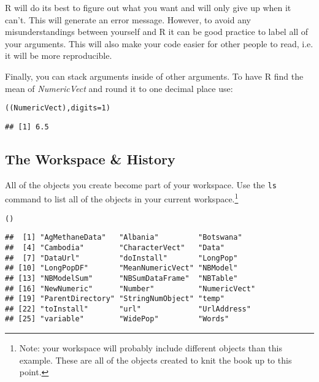 \noindent R will do its best to figure out what you want and will only give up when it can't. This will generate an error message. However, to avoid any misunderstandings between yourself and R it can be good practice to label all of your arguments. This will also make your code easier for other people to read, i.e. it will be more reproducible.

Finally, you can stack arguments inside of other arguments. To have R find the mean of {\emph{NumericVect}} and round it to one decimal place use:

\begin{knitrout}
\color{fgcolor}\begin{kframe}
\begin{alltt}
((NumericVect), digits = 1)
\end{alltt}
\begin{verbatim}
## [1] 6.5
\end{verbatim}
\end{kframe}
\end{knitrout}


\subsection{The Workspace \& History}

All of the objects you create become part of your workspace. Use the \texttt{ls} command to list all of the objects in your current workspace.\footnote{Note: your workspace will probably include different objects than this example. These are all of the objects created to knit the book up to this point.}

\begin{knitrout}
\color{fgcolor}\begin{kframe}
\begin{alltt}
()
\end{alltt}
\begin{verbatim}
##  [1] "AgMethaneData"   "Albania"         "Botswana"       
##  [4] "Cambodia"        "CharacterVect"   "Data"           
##  [7] "DataUrl"         "doInstall"       "LongPop"        
## [10] "LongPopDF"       "MeanNumericVect" "NBModel"        
## [13] "NBModelSum"      "NBSumDataFrame"  "NBTable"        
## [16] "NewNumeric"      "Number"          "NumericVect"    
## [19] "ParentDirectory" "StringNumObject" "temp"           
## [22] "toInstall"       "url"             "UrlAddress"     
## [25] "variable"        "WidePop"         "Words"
\end{verbatim}
\end{kframe}
\end{knitrout}


